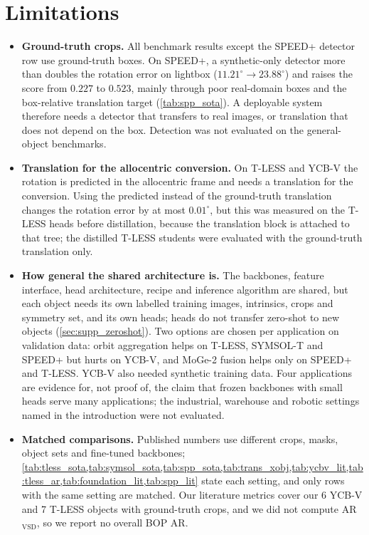 \section{Limitations}
\label{sec:limitations}
\begin{itemize}
\item \textbf{Ground-truth crops.} All benchmark results except the SPEED+ detector row use ground-truth boxes. On SPEED+, a synthetic-only detector more than doubles the rotation error on lightbox ($11.21^\circ\to23.88^\circ$) and raises the score from $0.227$ to $0.523$, mainly through poor real-domain boxes and the box-relative translation target (\cref{tab:spp_sota}). A deployable system therefore needs a detector that transfers to real images, or translation that does not depend on the box. Detection was not evaluated on the general-object benchmarks.
\item \textbf{Translation for the allocentric conversion.} On T-LESS and YCB-V the rotation is predicted in the allocentric frame and needs a translation for the conversion. Using the predicted instead of the ground-truth translation changes the rotation error by at most $0.01^\circ$, but this was measured on the T-LESS heads before distillation, because the translation block is attached to that tree; the distilled T-LESS students were evaluated with the ground-truth translation only.
\item \textbf{How general the shared architecture is.} The backbones, feature interface, head architecture, recipe and inference algorithm are shared, but each object needs its own labelled training images, intrinsics, crops and symmetry set, and its own heads; heads do not transfer zero-shot to new objects (\cref{sec:supp_zeroshot}). Two options are chosen per application on validation data: orbit aggregation helps on T-LESS, SYMSOL-T and SPEED+ but hurts on YCB-V, and MoGe-2 fusion helps only on SPEED+ and T-LESS. YCB-V also needed synthetic training data. Four applications are evidence for, not proof of, the claim that frozen backbones with small heads serve many applications; the industrial, warehouse and robotic settings named in the introduction were not evaluated.
\item \textbf{Matched comparisons.} Published numbers use different crops, masks, object sets and fine-tuned backbones; \cref{tab:tless_sota,tab:symsol_sota,tab:spp_sota,tab:trans_xobj,tab:ycbv_lit,tab:tless_ar,tab:foundation_lit,tab:spp_lit} state each setting, and only rows with the same setting are matched. Our literature metrics cover our 6 YCB-V and 7 T-LESS objects with ground-truth crops, and we did not compute AR$_\text{VSD}$, so we report no overall BOP AR.

\end{itemize}
